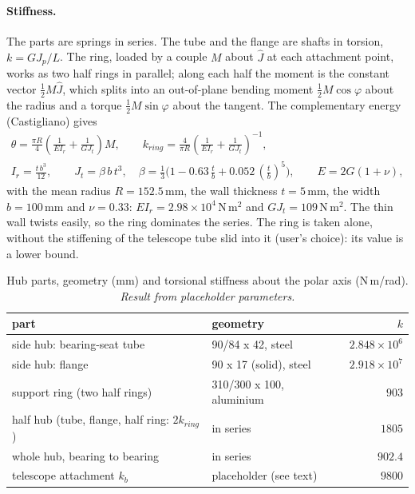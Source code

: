 \documentclass[10pt,a4paper]{article}
\numberwithin{equation}{section}
\begin{document}
\paragraph{Stiffness.} The parts are springs in series. The tube and the flange are shafts in torsion, $k = G J_p/L$. The ring, loaded by a couple $M$ about $\hat J$ at each attachment point, works as two half rings in parallel; along each half the moment is the constant vector $\tfrac12 M\hat J$, which splits into an out-of-plane bending moment $\tfrac12 M\cos\varphi$ about the radius and a torque $\tfrac12 M\sin\varphi$ about the tangent. The complementary energy (Castigliano) gives
\begin{gather}
\theta = \frac{\pi R}{4}\left(\frac{1}{E I_r} + \frac{1}{G J_t}\right) M,\qquad k_{ring} = \frac{4}{\pi R}\left(\frac{1}{E I_r} + \frac{1}{G J_t}\right)^{-1},\\
I_r = \frac{t\,b^3}{12},\qquad J_t = \beta\,b\,t^3,\quad \beta = \tfrac13\bigl(1 - 0.63\,\tfrac tb + 0.052\,(\tfrac tb)^5\bigr),\qquad E = 2G(1 + \nu),
\end{gather}
with the mean radius $R = 152.5$\,mm, the wall thickness $t = 5$\,mm, the width $b = 100$\,mm and $\nu = 0.33$: $E I_r = 2.98\times10^{4}$\,N\,m$^2$ and $G J_t = 109$\,N\,m$^2$. The thin wall twists easily, so the ring dominates the series. The ring is taken alone, without the stiffening of the telescope tube slid into it (user's choice): its value is a lower bound.
\begin{table}[H]\centering\small
\caption{Hub parts, geometry (mm) and torsional stiffness about the polar axis (N\,m/rad). \emph{Result from placeholder parameters.}}\label{tab:hub_parts}
\begin{tabular}{llr}\toprule
part & geometry & $k$ \\ \midrule
side hub: bearing-seat tube & 90/84 x 42, steel & $2.848\times10^{6}$ \\
side hub: flange & 90 x 17 (solid), steel & $2.918\times10^{7}$ \\
support ring (two half rings) & 310/300 x 100, aluminium & $903$ \\
\midrule
half hub (tube, flange, half ring: $2k_{ring}$) & in series & $1805$ \\
whole hub, bearing to bearing & in series & $902.4$ \\
telescope attachment $k_b$ & placeholder (see text) & $9800$ \\
\bottomrule\end{tabular}\end{table}
\end{document}
